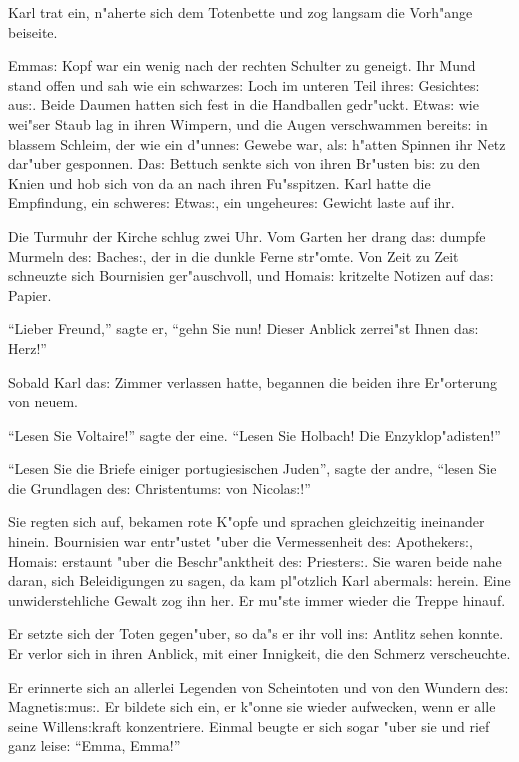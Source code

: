 \documentclass[oneside,12pt]{book}
\newcommand{\s}{s:}%
\begin{document}
Karl trat ein, n"aherte sich dem Totenbette und zog langsam die
Vorh"ange beiseite.

Emma{\s} Kopf war ein wenig nach der rechten Schulter zu geneigt.
Ihr Mund stand offen und sah wie ein schwarze{\s} Loch im unteren
Teil ihre{\s} Gesichte{\s} au{\s}. Beide Daumen hatten sich fest
in die Handballen gedr"uckt. Etwa{\s} wie wei"ser Staub lag in
ihren Wimpern, und die Augen verschwammen bereit{\s} in blassem
Schleim, der wie ein d"unne{\s} Gewebe war, al{\s} h"atten Spinnen
ihr Netz dar"uber gesponnen. Da{\s} Bettuch senkte sich von ihren
Br"usten bi{\s} zu den Knien und hob sich von da an nach ihren
Fu"sspitzen. Karl hatte die Empfindung, ein schwere{\s} Etwa{\s},
ein ungeheure{\s} Gewicht laste auf ihr.

Die Turmuhr der Kirche schlug zwei Uhr. Vom Garten her drang
da{\s} dumpfe Murmeln de{\s} Bache{\s}, der in die dunkle Ferne
str"omte. Von Zeit zu Zeit schneuzte sich Bournisien
ger"auschvoll, und Homai{\s} kritzelte Notizen auf da{\s} Papier.

"`Lieber Freund,"' sagte er, "`gehn Sie nun! Dieser Anblick
zerrei"st Ihnen da{\s} Herz!"'

Sobald Karl da{\s} Zimmer verlassen hatte, begannen die beiden
ihre Er"orterung von neuem.

"`Lesen Sie Voltaire!"' sagte der eine. "`Lesen Sie Holbach! Die
Enzyklop"adisten!"'

"`Lesen Sie die {\glq}Briefe einiger portugiesischen Juden{\grq}"',
sagte der andre, "`lesen Sie die {\glq}Grundlagen de{\s}
Christentum{\s}{\grq} von Nicola{\s}!"'

Sie regten sich auf, bekamen rote K"opfe und sprachen gleichzeitig
ineinander hinein. Bournisien war entr"ustet "uber die Vermessenheit
de{\s} Apotheker{\s}, Homai{\s} erstaunt "uber die Beschr"anktheit
de{\s} Priester{\s}. Sie waren beide nahe daran, sich Beleidigungen
zu sagen, da kam pl"otzlich Karl abermal{\s} herein. Eine
unwiderstehliche Gewalt zog ihn her. Er mu"ste immer wieder die
Treppe hinauf.

Er setzte sich der Toten gegen"uber, so da"s er ihr voll in{\s}
Antlitz sehen konnte. Er verlor sich in ihren Anblick, mit einer
Innigkeit, die den Schmerz verscheuchte.

Er erinnerte sich an allerlei Legenden von Scheintoten und von den
Wundern de{\s} Magneti{\s}mu{\s}. Er bildete sich ein, er k"onne
sie wieder aufwecken, wenn er alle seine Willen{\s}kraft
konzentriere. Einmal beugte er sich sogar "uber sie und rief ganz
leise: "`Emma, Emma!"'
\end{document}
